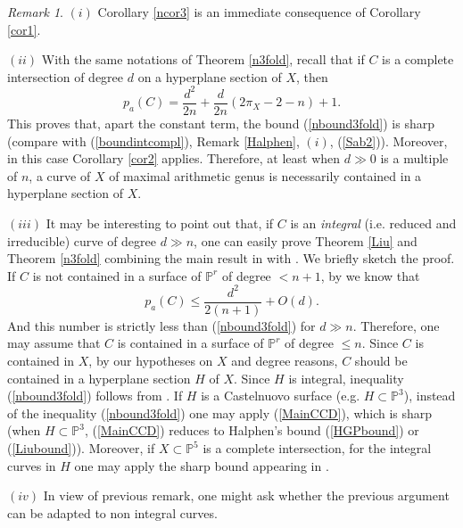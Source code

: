 \documentclass[9pt,a4paper]{amsart}
\theoremstyle{plain}
\theoremstyle{definition}
\theoremstyle{remark}
\newtheorem{remark}[theorem]{Remark}
\begin{document}
\smallskip
\begin{remark}\label{finalr}
$(i)$ Corollary \ref{ncor3} is an immediate consequence of Corollary
\ref{cor1}.

\smallskip
$(ii)$ With the same notations of Theorem \ref{n3fold}, recall that
if $C$ is a complete intersection of degree $d$ on a hyperplane
section of $X$, then
$$
p_a(C)=\frac{{d}^2}{2n}+\frac{d}{2n}(2\pi_X-2-n)+1.
$$
This proves that, apart the constant term, the bound
(\ref{nbound3fold}) is sharp (compare with (\ref{boundintcompl}), Remark \ref{Halphen}, $(i)$,  (\ref{Sab2})).
Moreover, in this case Corollary
\ref{cor2} applies. Therefore, at least when $d\gg 0$ is a multiple
of $n$, a curve of $X$ of maximal arithmetic genus is necessarily
contained in a hyperplane section of $X$.

\smallskip
$(iii)$ It may be interesting to point out that, if $C$ is an
{\it integral} (i.e. reduced and irreducible) curve of degree $d\gg n$,
one can easily prove Theorem \ref{Liu} and Theorem
\ref{n3fold} combining the main
result in \cite{CCD} with \cite[Lemma]{D3}. We briefly sketch the proof. If $C$ is not
contained in a surface of $\mathbb P^r$ of degree $<n+1$, by
\cite{CCD} we know that
$$
p_a(C)\leq \frac{{d}^2}{2(n+1)}+O(d).
$$
And this number is strictly less than (\ref{nbound3fold}) for $d\gg n$.
Therefore, one may assume that $C$ is contained in a surface of
$\mathbb P^r$ of degree $\leq n$. Since $C$ is contained in $X$, by
our hypotheses on $X$ and degree reasons, $C$ should be contained in
a hyperplane section $H$ of $X$. Since $H$ is integral, inequality
(\ref{nbound3fold}) follows from \cite[Lemma]{D3}. If $H$ is a Castelnuovo surface (e.g. $H\subset\mathbb P^3$),
instead of the inequality (\ref{nbound3fold})
one may apply (\ref{MainCCD}), which is sharp (when $H\subset\mathbb P^3$, (\ref{MainCCD}) reduces to
Halphen's bound  (\ref{HGPbound}) or (\ref{Liubound})). Moreover,
if $X\subset \mathbb P^5$ is a complete intersection, for the integral curves in $H$ one may apply
the sharp bound appearing in \cite[Theorem, p. 119]{P4}.


\smallskip
$(iv)$ In view of previous remark, one might ask whether the
previous argument can be adapted to non integral curves.
\end{remark}









\bigskip
\end{document}
